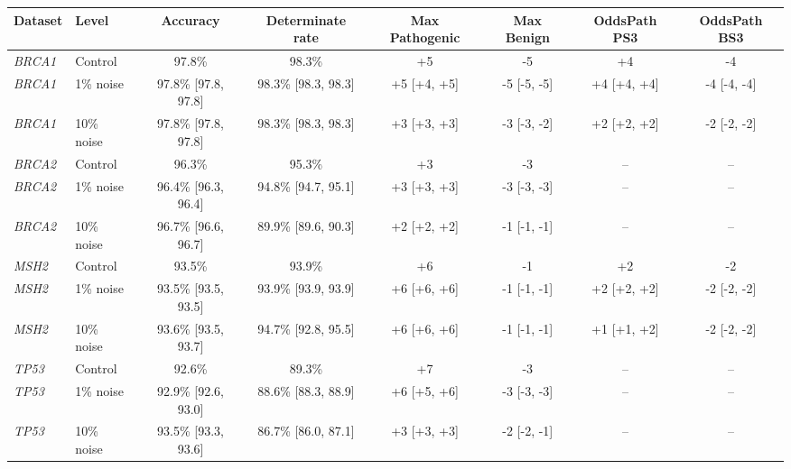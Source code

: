 \begin{tabular}{llcccccc}
\toprule
Dataset & Level & Accuracy & Determinate rate & Max Pathogenic & Max Benign & OddsPath PS3 & OddsPath BS3 \\
\midrule
\textit{BRCA1} & Control & 97.8\% & 98.3\% & +5 & -5 & +4 & -4 \\
\textit{BRCA1} & 1\% noise & 97.8\% [97.8, 97.8] & 98.3\% [98.3, 98.3] & +5 [+4, +5] & -5 [-5, -5] & +4 [+4, +4] & -4 [-4, -4] \\
\textit{BRCA1} & 10\% noise & 97.8\% [97.8, 97.8] & 98.3\% [98.3, 98.3] & +3 [+3, +3] & -3 [-3, -2] & +2 [+2, +2] & -2 [-2, -2] \\
\midrule
\textit{BRCA2} & Control & 96.3\% & 95.3\% & +3 & -3 & -- & -- \\
\textit{BRCA2} & 1\% noise & 96.4\% [96.3, 96.4] & 94.8\% [94.7, 95.1] & +3 [+3, +3] & -3 [-3, -3] & -- & -- \\
\textit{BRCA2} & 10\% noise & 96.7\% [96.6, 96.7] & 89.9\% [89.6, 90.3] & +2 [+2, +2] & -1 [-1, -1] & -- & -- \\
\midrule
\textit{MSH2} & Control & 93.5\% & 93.9\% & +6 & -1 & +2 & -2 \\
\textit{MSH2} & 1\% noise & 93.5\% [93.5, 93.5] & 93.9\% [93.9, 93.9] & +6 [+6, +6] & -1 [-1, -1] & +2 [+2, +2] & -2 [-2, -2] \\
\textit{MSH2} & 10\% noise & 93.6\% [93.5, 93.7] & 94.7\% [92.8, 95.5] & +6 [+6, +6] & -1 [-1, -1] & +1 [+1, +2] & -2 [-2, -2] \\
\midrule
\textit{TP53} & Control & 92.6\% & 89.3\% & +7 & -3 & -- & -- \\
\textit{TP53} & 1\% noise & 92.9\% [92.6, 93.0] & 88.6\% [88.3, 88.9] & +6 [+5, +6] & -3 [-3, -3] & -- & -- \\
\textit{TP53} & 10\% noise & 93.5\% [93.3, 93.6] & 86.7\% [86.0, 87.1] & +3 [+3, +3] & -2 [-2, -1] & -- & -- \\
\bottomrule
\end{tabular}
